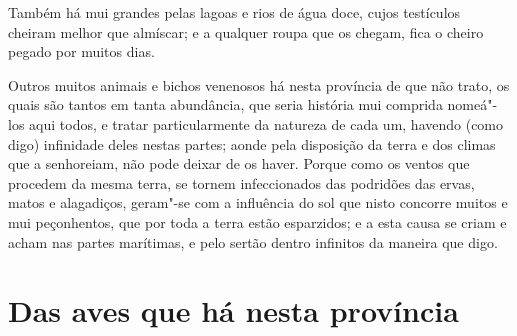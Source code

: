 Também há  mui grandes pelas lagoas e rios de água doce, cujos
testículos cheiram melhor que almíscar; e a qualquer roupa que os
chegam, fica o cheiro pegado por muitos dias.

Outros muitos animais e bichos venenosos há nesta província de que não
trato, os quais são tantos em tanta abundância, que seria história mui
comprida nomeá"-los aqui todos, e tratar particularmente da natureza de
cada um, havendo (como digo) infinidade deles nestas partes; aonde pela
disposição da terra e dos climas que a senhoreiam, não pode deixar de os			%
haver. Porque como os ventos que procedem da mesma terra, se tornem
infeccionados das podridões das ervas, matos e alagadiços, geram"-se com
a influência do sol que nisto concorre muitos e mui peçonhentos, que
por toda a terra estão esparzidos; e a esta causa se criam e acham nas
partes marítimas, e pelo sertão dentro infinitos da maneira que digo.



\chapter[Das aves que há nesta província]{Das aves que há nesta província}



